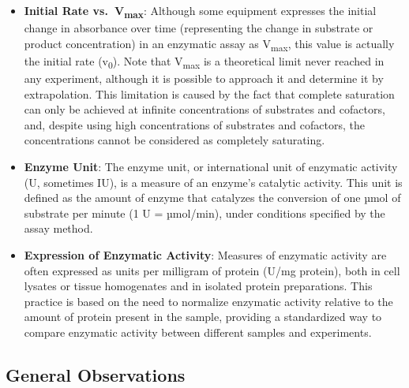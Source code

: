 \documentclass[
  9pt,
  american,
  a5paper,
  extrafontsizes,onecolumn,openright
  ]{memoir}
\begin{document}
\begin{itemize}
\item
  \textbf{Initial Rate vs.~V\textsubscript{max}}: Although some equipment expresses the initial change in absorbance over time (representing the change in substrate or product concentration) in an enzymatic assay as V\textsubscript{max}, this value is actually the initial rate (v\textsubscript{0}). Note that V\textsubscript{max} is a theoretical limit never reached in any experiment, although it is possible to approach it and determine it by extrapolation. This limitation is caused by the fact that complete saturation can only be achieved at infinite concentrations of substrates and cofactors, and, despite using high concentrations of substrates and cofactors, the concentrations cannot be considered as completely saturating.
\item
  \textbf{Enzyme Unit}: The enzyme unit, or international unit of enzymatic activity (U, sometimes IU), is a measure of an enzyme's catalytic activity. This unit is defined as the amount of enzyme that catalyzes the conversion of one µmol of substrate per minute (1 U = µmol/min), under conditions specified by the assay method.
\item
  \textbf{Expression of Enzymatic Activity}: Measures of enzymatic activity are often expressed as units per milligram of protein (U/mg protein), both in cell lysates or tissue homogenates and in isolated protein preparations. This practice is based on the need to normalize enzymatic activity relative to the amount of protein present in the sample, providing a standardized way to compare enzymatic activity between different samples and experiments.
\end{itemize}

\subsection{General Observations}\label{general-observations}
\end{document}

